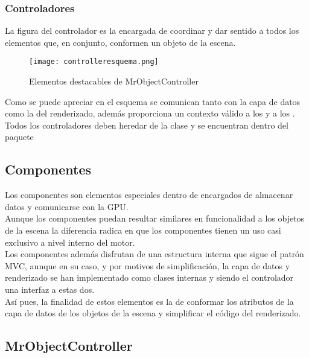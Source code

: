 \subsubsection{Controladores}
La figura del controlador es la encargada de coordinar y dar sentido a todos los elementos que, en conjunto, conformen un objeto de la escena. 

\begin{figure}[h!]
\begin{center}
\texttt{[image: controlleresquema.png]}
\end{center}
\caption[Elementos destacables de MrObjectController]{Elementos destacables de MrObjectController}
\label{fig:controlleresquema}
\end{figure}

Como se puede apreciar en el esquema se comunican tanto con la capa de datos como la del renderizado, además proporciona un contexto válido a los \rorefobject y a los \rorefeventlistener.\\

Todos los controladores deben heredar de la clase \rorefobjectcontroller y se encuentran dentro del paquete \\

\subsection{Componentes}
Los componentes son elementos especiales dentro de \robotto encargados de almacenar datos y comunicarse con la GPU.\\
Aunque los componentes puedan resultar similares en funcionalidad a los objetos de la escena la diferencia radica en que los componentes tienen un uso casi exclusivo a nivel interno del motor.\\
Los componentes además disfrutan de una estructura interna que sigue el patrón MVC, aunque en su caso, y por motivos de simplificación, la capa de datos y renderizado se han implementado como clases internas y siendo el controlador una interfaz a estas dos.\\

Así pues, la finalidad de estos elementos es la de conformar los atributos de la capa de datos de los objetos de la escena y simplificar el código del renderizado.

\subsection{MrObjectController}

